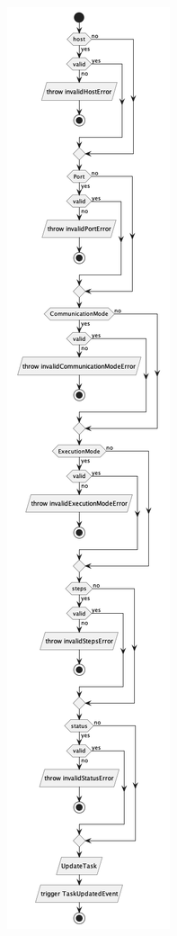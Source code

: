 \begin{figure}[H]
    \centering
    \includegraphics[height=0.5\textheight]{./part/Proyecto_ejecutivo/memoria_descriptiva/descripcionDelProyecto/manager/uml/updateTaskUseCase}
    \caption[Diagrama de objetos de dominio]{}\label{fig:updateTaskUseCase}
\end{figure}

